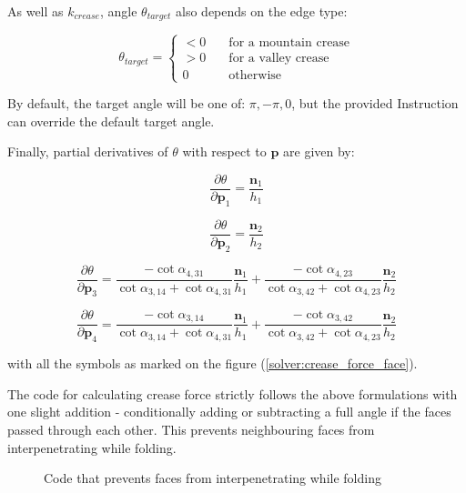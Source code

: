 As well as $k_{crease}$, angle $\theta _{target}$ also depends on the edge type:

$$
\theta _{target} =
\begin{cases}
	< 0 & \quad \text{for a mountain crease}\\
	> 0 & \quad \text{for a valley crease}\\
	0 & \quad \text{otherwise}
\end{cases}
$$

By default, the target angle will be one of: $\pi, -\pi, 0$, but the provided Instruction can override the default target angle.
\smallskip

Finally, partial derivatives of $\theta$ with respect to $\pmb{p}$ are given by:

\begin{equation} \label{solver:crease_force1}
\frac{\partial \theta}{\partial \pmb{p}_1} = \frac{\pmb{n}_1}{h_1}
\end{equation}

\begin{equation} \label{solver:crease_force2}
\frac{\partial \theta}{\partial \pmb{p}_2} = \frac{\pmb{n}_2}{h_2}
\end{equation}

\begin{equation} \label{solver:crease_force3}
	\frac{\partial \theta}{\partial \pmb{p}_3} = \frac{-\cot{\alpha _{4,31}}}{\cot{\alpha _{3,14}} + \cot{\alpha _{4,31}}} \frac{\pmb{n}_1}{h_1} + \frac{-\cot{\alpha _{4,23}}}{\cot{\alpha _{3,42}} + \cot{\alpha _{4,23}}} \frac{\pmb{n}_2}{h_2} 
\end{equation}

\begin{equation} \label{solver:crease_force4}
\frac{\partial \theta}{\partial \pmb{p}_4} = \frac{-\cot{\alpha _{3,14}}}{\cot{\alpha _{3,14}} + \cot{\alpha _{4,31}}} \frac{\pmb{n}_1}{h_1} + \frac{-\cot{\alpha _{3,42}}}{\cot{\alpha _{3,42}} + \cot{\alpha _{4,23}}} \frac{\pmb{n}_2}{h_2} 
\end{equation}

with all the symbols as marked on the figure (\ref{solver:crease_force_face}).
\smallskip

The code for calculating crease force strictly follows the above formulations with one slight
addition - conditionally adding or subtracting a full angle if the faces passed through each other.
This prevents neighbouring faces from interpenetrating while folding.

\begin{figure}[H]
	\caption{Code that prevents faces from interpenetrating while folding}
	
\end{figure}

